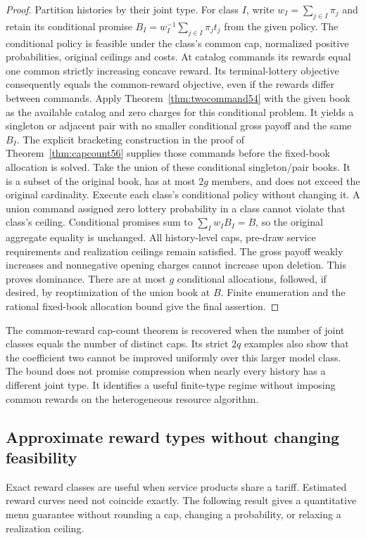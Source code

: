 \documentclass[11pt,letterpaper]{article}
\theoremstyle{definition}\newtheorem{remark}[theorem]{Remark}
\begin{document}
\begin{proof}
Partition histories by their joint type. For class $I$, write $w_I=\sum_{j\in I}\pi_j$ and retain its conditional promise $B_I=w_I^{-1}\sum_{j\in I}\pi_j t_j$ from the given policy. The conditional policy is feasible under the class's common cap, normalized positive probabilities, original ceilings and costs. At catalog commands its rewards equal one common strictly increasing concave reward. Its terminal-lottery objective consequently equals the common-reward objective, even if the rewards differ between commands. Apply Theorem~\ref{thm:twocommand54} with the given book as the available catalog and zero charges for this conditional problem. It yields a singleton or adjacent pair with no smaller conditional gross payoff and the same $B_I$. The explicit bracketing construction in the proof of Theorem~\ref{thm:capcount56} supplies those commands before the fixed-book allocation is solved.
Take the union of these conditional singleton/pair books. It is a subset of the original book, has at most $2g$ members, and does not exceed the original cardinality. Execute each class's conditional policy without changing it. A union command assigned zero lottery probability in a class cannot violate that class's ceiling. Conditional promises sum to $\sum_I w_I B_I=B$, so the original aggregate equality is unchanged. All history-level caps, pre-draw service requirements and realization ceilings remain satisfied. The gross payoff weakly increases and nonnegative opening charges cannot increase upon deletion. This proves dominance. There are at most $g$ conditional allocations, followed, if desired, by reoptimization of the union book at $B$. Finite enumeration and the rational fixed-book allocation bound give the final assertion.
\end{proof}

The common-reward cap-count theorem is recovered when the number of joint classes equals the number of distinct caps. Its strict $2q$ examples also show that the coefficient two cannot be improved uniformly over this larger model class. The bound does not promise compression when nearly every history has a different joint type. It identifies a useful finite-type regime without imposing common rewards on the heterogeneous resource algorithm.
\subsection{Approximate reward types without changing feasibility}\label{sec:robusttypes58}
Exact reward classes are useful when service products share a tariff. Estimated reward curves need not coincide exactly. The following result gives a quantitative menu guarantee without rounding a cap, changing a probability, or relaxing a realization ceiling.
\end{document}
